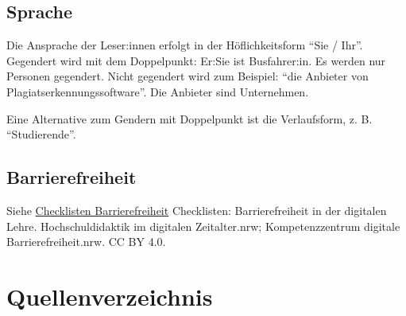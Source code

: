 \documentclass[
  letterpaper,
  DIV=11]{scrartcl}
\begin{document}
\subsection{Sprache}\label{sprache}

Die Ansprache der Leser:innen erfolgt in der Höflichkeitsform ``Sie /
Ihr''. Gegendert wird mit dem Doppelpunkt: Er:Sie ist Busfahrer:in. Es
werden nur Personen gegendert. Nicht gegendert wird zum Beispiel: ``die
Anbieter von Plagiatserkennungssoftware''. Die Anbieter sind
Unternehmen.

Eine Alternative zum Gendern mit Doppelpunkt ist die Verlaufsform, z. B.
``Studierende''.

\subsection{Barrierefreiheit}\label{barrierefreiheit}

Siehe
\href{https://digitale-lehre.uni-siegen.de/wp-content/uploads/2023/09/Checkliste_Barrierefreiheit-in-der-digitalen-Lehre_Sept23.pdf}{Checklisten
Barrierefreiheit} Checklisten: Barrierefreiheit in der digitalen Lehre.
Hochschuldidaktik im digitalen Zeitalter.nrw; Kompetenzzentrum digitale
Barrierefreiheit.nrw. CC BY 4.0.

\section*{Quellenverzeichnis}\label{quellenverzeichnis}

\printbibliography[heading=none]


\printbibliography[title=Quellen]
\end{document}
